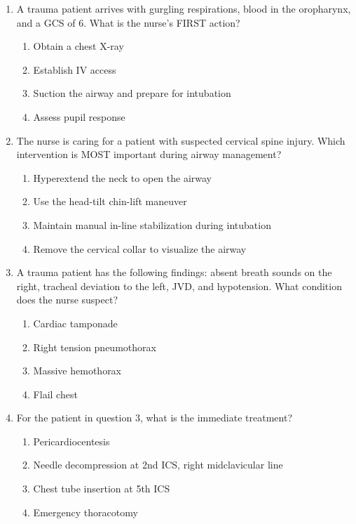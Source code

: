 \documentclass[11pt]{article}
\begin{document}
\begin{enumerate}

\item A trauma patient arrives with gurgling respirations, blood in the oropharynx, and a GCS of 6. What is the nurse's FIRST action?

\begin{enumerate}[label=\Alph*.]
    \item Obtain a chest X-ray
    \item Establish IV access
    \item Suction the airway and prepare for intubation
    \item Assess pupil response
\end{enumerate}

\item The nurse is caring for a patient with suspected cervical spine injury. Which intervention is MOST important during airway management?

\begin{enumerate}[label=\Alph*.]
    \item Hyperextend the neck to open the airway
    \item Use the head-tilt chin-lift maneuver
    \item Maintain manual in-line stabilization during intubation
    \item Remove the cervical collar to visualize the airway
\end{enumerate}

\item A trauma patient has the following findings: absent breath sounds on the right, tracheal deviation to the left, JVD, and hypotension. What condition does the nurse suspect?

\begin{enumerate}[label=\Alph*.]
    \item Cardiac tamponade
    \item Right tension pneumothorax
    \item Massive hemothorax
    \item Flail chest
\end{enumerate}

\item For the patient in question 3, what is the immediate treatment?

\begin{enumerate}[label=\Alph*.]
    \item Pericardiocentesis
    \item Needle decompression at 2nd ICS, right midclavicular line
    \item Chest tube insertion at 5th ICS
    \item Emergency thoracotomy
\end{enumerate}


\end{enumerate}
\end{document}

